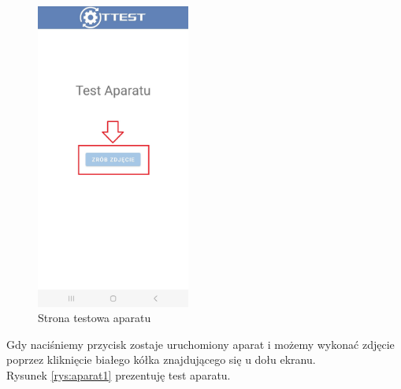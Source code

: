 \begin{figure}[!hbt]
	\begin{center}
		\includegraphics[angle=360, width=0.45\textwidth]{rys/punkt6/aparat}
		\caption{Strona testowa aparatu}
		\label{rys:aparat}
	\end{center}
\end{figure}

\newpage


Gdy naciśniemy przycisk zostaje uruchomiony aparat i możemy wykonać zdjęcie poprzez kliknięcie białego kółka znajdującego się u dołu ekranu. \\
Rysunek \ref{rys:aparat1} prezentuję test aparatu.

